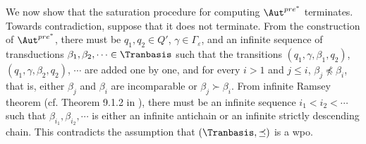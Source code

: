We now show that the  saturation procedure for computing $\Aut^{pre^*}$ terminates. 
%
Towards contradiction, suppose that 
it does not terminate. From the construction of $\Aut^{pre^*}$, there must be $q_1, q_2 \in Q'$, $\gamma \in \Gamma_\varepsilon$, and an infinite sequence of transductions $\beta_1, \beta_2, \cdots \in \Tranbasis$ such that the transitions $(q_1, \gamma, \beta_1, q_2) $, $(q_1, \gamma, \beta_2, q_2) $, $\cdots$ are added one by one,  and for every $i > 1$ and $j \le i$, $\beta_j \not \preceq \beta_i$,  that is, either $\beta_j$ and $\beta_i$ are incomparable or $\beta_j \succ \beta_i$. From infinite Ramsey theorem (cf. Theorem 9.1.2 in \cite{Rein00}), there must be an infinite sequence $i_1 < i_2 < \cdots$ such that $\beta_{i_1}, \beta_{i_2}, \cdots$ is either an infinite antichain or an infinite strictly descending chain. This contradicts the assumption that $(\Tranbasis, \preceq)$ is a wpo. 


